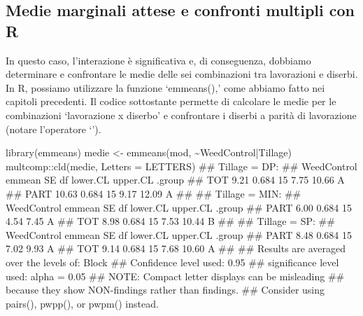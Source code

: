 \documentclass[a4paper,12pt,oneside]{book}
\newenvironment{Shaded}{\begin{snugshade}}{\end{snugshade}}
\newcommand{\SpecialCharTok}[1]{#1}
\newcommand{\DocumentationTok}[1]{#1}
\newcommand{\OtherTok}[1]{#1}
\newcommand{\FunctionTok}[1]{#1}
\newcommand{\AttributeTok}[1]{#1}
\newcommand{\AlertTok}[1]{#1}
\newcommand{\NormalTok}[1]{#1}
\begin{document}
\hypertarget{medie-marginali-attese-e-confronti-multipli-con-r}{%
\subsection{Medie marginali attese e confronti multipli con R}\label{medie-marginali-attese-e-confronti-multipli-con-r}}

In questo caso, l'interazione è significativa e, di conseguenza, dobbiamo determinare e confrontare le medie delle sei combinazioni tra lavorazioni e diserbi. In R, possiamo utilizzare la funzione `emmeans(),' come abbiamo fatto nei capitoli precedenti. Il codice sottostante permette di calcolare le medie per le combinazioni `lavorazione x diserbo' e confrontare i diserbi a parità di lavorazione (notare l'operatore `\textbar{}').

\begin{Shaded}
\begin{Highlighting}[]
\FunctionTok{library}\NormalTok{(emmeans)}
\NormalTok{medie }\OtherTok{\textless{}{-}} \FunctionTok{emmeans}\NormalTok{(mod, }\SpecialCharTok{\textasciitilde{}}\NormalTok{WeedControl}\SpecialCharTok{|}\NormalTok{Tillage)}
\NormalTok{multcomp}\SpecialCharTok{::}\FunctionTok{cld}\NormalTok{(medie, }\AttributeTok{Letters =}\NormalTok{ LETTERS)}
\DocumentationTok{\#\# Tillage = DP:}
\DocumentationTok{\#\#  WeedControl emmean    SE df lower.CL upper.CL .group}
\DocumentationTok{\#\#  TOT           9.21 0.684 15     7.75    10.66  A    }
\DocumentationTok{\#\#  PART         10.63 0.684 15     9.17    12.09  A    }
\DocumentationTok{\#\# }
\DocumentationTok{\#\# Tillage = MIN:}
\DocumentationTok{\#\#  WeedControl emmean    SE df lower.CL upper.CL .group}
\DocumentationTok{\#\#  PART          6.00 0.684 15     4.54     7.45  A    }
\DocumentationTok{\#\#  TOT           8.98 0.684 15     7.53    10.44   B   }
\DocumentationTok{\#\# }
\DocumentationTok{\#\# Tillage = SP:}
\DocumentationTok{\#\#  WeedControl emmean    SE df lower.CL upper.CL .group}
\DocumentationTok{\#\#  PART          8.48 0.684 15     7.02     9.93  A    }
\DocumentationTok{\#\#  TOT           9.14 0.684 15     7.68    10.60  A    }
\DocumentationTok{\#\# }
\DocumentationTok{\#\# Results are averaged over the levels of: Block }
\DocumentationTok{\#\# Confidence level used: 0.95 }
\DocumentationTok{\#\# significance level used: alpha = 0.05 }
\DocumentationTok{\#\# }\AlertTok{NOTE}\DocumentationTok{: Compact letter displays can be misleading}
\DocumentationTok{\#\#       because they show NON{-}findings rather than findings.}
\DocumentationTok{\#\#       Consider using \textquotesingle{}pairs()\textquotesingle{}, \textquotesingle{}pwpp()\textquotesingle{}, or \textquotesingle{}pwpm()\textquotesingle{} instead.}
\end{Highlighting}
\end{Shaded}
\end{document}
